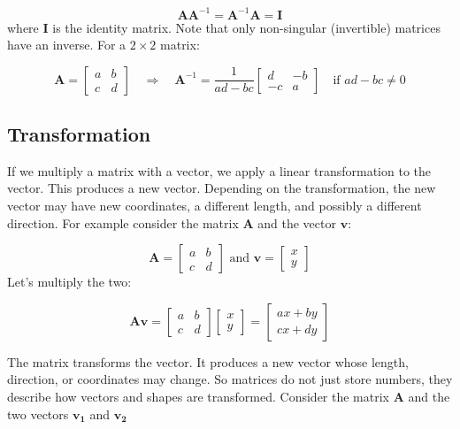 \documentclass[
]{article}
\begin{document}
\[
\mathbf{A} \mathbf{A}^{-1} = \mathbf{A}^{-1} \mathbf{A} = \mathbf{I}
\] where \(\mathbf{I}\) is the identity matrix. Note that only
non-singular (invertible) matrices have an inverse. For a \(2 \times 2\)
matrix:

\[
\mathbf{A} =
\begin{bmatrix}
a & b \\
c & d
\end{bmatrix}
\quad \Rightarrow \quad
\mathbf{A}^{-1} = \frac{1}{ad - bc}
\begin{bmatrix}
d & -b \\
-c & a
\end{bmatrix}
\quad \text{if } ad - bc \neq 0
\]

\hypertarget{transformation}{%
\subsection{Transformation}\label{transformation}}

If we multiply a matrix with a vector, we apply a linear transformation
to the vector. This produces a new vector. Depending on the
transformation, the new vector may have new coordinates, a different
length, and possibly a different direction. For example consider the
matrix \(\mathbf{A}\) and the vector \(\mathbf{v}\):

\[
\mathbf{A} = \begin{bmatrix}
a & b \\
c & d
\end{bmatrix}
\text{ and }
\mathbf{v} = \begin{bmatrix}
x \\
y
\end{bmatrix}
\] Let's multiply the two:

\[
\mathbf{Av} =
\begin{bmatrix}
a & b \\
c & d
\end{bmatrix}
\begin{bmatrix}
x \\
y
\end{bmatrix}
=
\begin{bmatrix}
ax + by \\
cx + dy
\end{bmatrix}
\]

The matrix transforms the vector. It produces a new vector whose length,
direction, or coordinates may change. So matrices do not just store
numbers, they describe how vectors and shapes are transformed. Consider
the matrix \(\mathbf{A}\) and the two vectors \(\mathbf{v_1}\) and
\(\mathbf{v_2}\)
\end{document}
